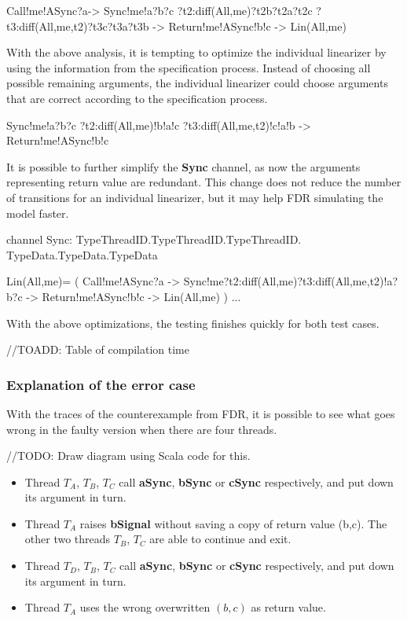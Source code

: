 \documentclass{article}
\begin{document}
\begin{cspm}
  Call!me!ASync?a->
    Sync!me!a?b?c 
        ?t2:diff(All,{me})?t2b?t2a?t2c 
        ?t3:diff(All,{me,t2})?t3c?t3a?t3b ->
    Return!me!ASync!b!c ->
    Lin(All,me)
\end{cspm}
    
With the above analysis, it is tempting to optimize the individual linearizer by using the information from the specification process. Instead of choosing all possible remaining arguments, the individual linearizer could choose arguments that are correct according to the specification process.

\begin{cspm}
  Sync!me!a?b?c 
      ?t2:diff(All,{me})!b!a!c
      ?t3:diff(All,{me,t2})!c!a!b ->
  Return!me!ASync!b!c
\end{cspm}

It is possible to further simplify the \textbf{Sync} channel, as now the arguments representing return value are redundant. This change does not reduce the number of transitions for an individual linearizer, but it may help FDR simulating the model faster.

\begin{cspm}
channel Sync: TypeThreadID.TypeThreadID.TypeThreadID.
              TypeData.TypeData.TypeData

Lin(All,me)= (
  Call!me!ASync?a ->
  Sync!me?t2:diff(All,{me})?t3:diff(All,{me,t2})!a?b?c ->
  Return!me!ASync!b!c ->
  Lin(All,me)
) ...
\end{cspm}

With the above optimizations, the testing finishes quickly for both test cases.

//TOADD: Table of compilation time

\subsubsection{Explanation of the error case}
With the traces of the counterexample from FDR, it is possible to see what goes wrong in the faulty version when there are four threads.

//TODO: Draw diagram using Scala code for this.
\begin{itemize}
  \item Thread $T_A$, $T_B$, $T_C$ call \textbf{aSync}, \textbf{bSync} or \textbf{cSync} respectively, and put down its argument in turn.
  \item Thread $T_A$ raises \textbf{bSignal} without saving a copy of   return value {(b,c)}. The other two threads $T_B$, $T_C$ are able   to continue and exit. 
  \item Thread $T_D$, $T_B$, $T_C$ call \textbf{aSync}, \textbf{bSync} or \textbf{cSync} respectively, and put down its argument in turn.
  \item Thread $T_A$ uses the wrong overwritten $(b,c)$ as return value. 
  
\end{itemize}
\end{document}

